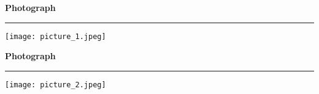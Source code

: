 \documentclass[a4paper,12pt]{article}
\begin{document}
\newpage
\begin{center}
    {\Huge \textbf{Photograph}}\\[5pt]
    \textcolor{maroon}{\rule{\textwidth}{2pt}}
\end{center}

\vspace{10pt}

\centering
\texttt{[image: picture\_1.jpeg]} %

\newpage
\begin{center}
    {\Huge \textbf{Photograph}}\\[5pt]
    \textcolor{maroon}{\rule{\textwidth}{2pt}}
\end{center}

\vspace{10pt}

\centering
\texttt{[image: picture\_2.jpeg]} %
\end{document}
